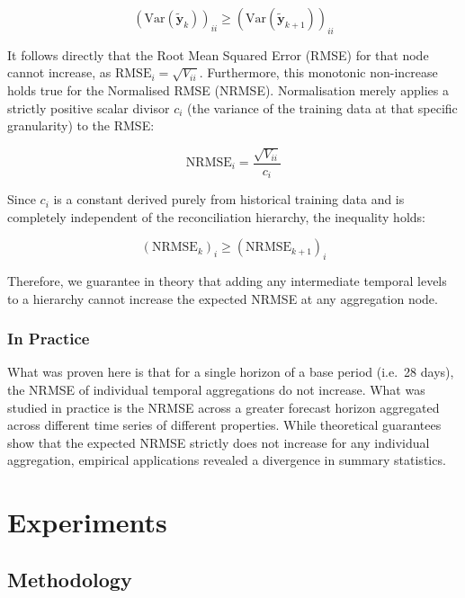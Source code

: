 \documentclass[sn-basic,Numbered,iicol]{sn-jnl}
\theoremstyle{thmstyleone}%
\theoremstyle{thmstyletwo}%
\theoremstyle{thmstylethree}%
\begin{document}
\begin{equation}
(\text{Var}(\tilde{\mathbf{y}}_k))_{ii}\ge(\text{Var}(\tilde{\mathbf{y}}_{k+1}))_{ii}
\end{equation}

It follows directly that the Root Mean Squared Error (RMSE) for that node cannot increase, as $\text{RMSE}_i=\sqrt{V_{ii}}$. Furthermore, this monotonic non-increase holds true for the Normalised RMSE (NRMSE). Normalisation merely applies a strictly positive scalar divisor $c_i$ (the variance of the training data at that specific granularity) to the RMSE:

\begin{equation}
\text{NRMSE}_i=\frac{\sqrt{V_{ii}}}{c_i}
\end{equation}

Since $c_i$ is a constant derived purely from historical training data and is completely independent of the reconciliation hierarchy, the inequality holds:

\begin{equation}
(\text{NRMSE}_k)_i\ge(\text{NRMSE}_{k+1})_i
\end{equation}

Therefore, we guarantee in theory that adding any intermediate temporal levels to a hierarchy cannot increase the expected NRMSE at any aggregation node.

\subsubsection{In Practice}\label{subsubsec:practice}

What was proven here is that for a single horizon of a base period (i.e.\ 28 days), the NRMSE of individual temporal aggregations do not increase. What was studied in practice is the NRMSE across a greater forecast horizon aggregated across different time series of different properties. While theoretical guarantees show that the expected NRMSE strictly does not increase for any individual aggregation, empirical applications revealed a divergence in summary statistics.


\section{Experiments}\label{sec4}

\subsection{Methodology}\label{subsec:methodology}
\end{document}
